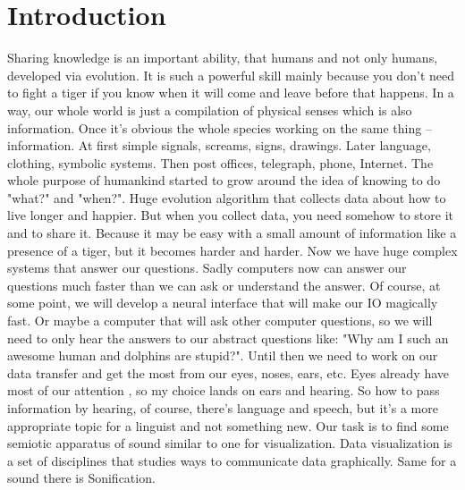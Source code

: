 \chapter{Introduction}
Sharing knowledge is an important ability, that humans and not only humans, developed via evolution.
It is such a powerful skill mainly because you don't need to fight a tiger if you know when it will come and leave before that happens.  
In a way, our whole world is just a compilation of physical senses which is also information. Once it's obvious the whole species working on the same thing -- information.
At first simple signals, screams, signs, drawings. Later language, clothing, symbolic systems. Then post offices, telegraph, phone, Internet.
The whole purpose of humankind started to grow around the idea of knowing to do "what?" and "when?". Huge evolution algorithm that collects data about how to live longer and happier. 
But when you collect data, you need somehow to store it and to share it. Because it may be easy with a small amount of information like a presence of a tiger, but it becomes harder and harder.
Now we have huge complex systems that answer our questions. Sadly computers now can answer our questions much faster than we can ask or understand the answer. Of course, at some point, we will develop a neural interface that will make our IO magically fast.  Or maybe a computer that will ask other computer questions, so we will need to only hear the answers to our abstract questions like: "Why am I such an awesome human and dolphins are stupid?".
Until then we need to work on our data transfer and get the most from our eyes, noses, ears, etc. 
Eyes already have most of our attention \cite{Hutmacher}, so my choice lands on ears and hearing. So how to pass information by hearing, of course, there's language and speech, but it's a more appropriate topic for a linguist and not something new. Our task is to find some semiotic apparatus of sound similar to one for visualization. Data visualization is a set of disciplines that studies ways to communicate data graphically. Same for a sound there is Sonification.